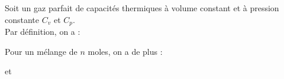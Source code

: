 \documentclass[a4paper]{article}
\begin{document}
\pagestyle{fancy}
\fancyhf{}
\setlength{\headheight}{15pt}

\begin{center}
	\large{}
\end{center}


Soit un gaz parfait de capacités thermiques à volume constant et à pression constante \(C_v\) et \(C_p\).\\
Par définition, on a :\begin{center}\end{center}
Pour un mélange de \(n\) moles, on a de plus :\begin{center} et \end{center}
\end{document}
